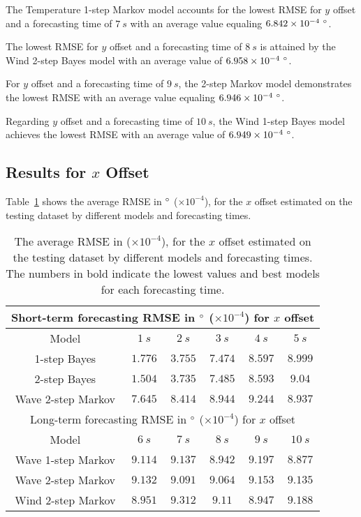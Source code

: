 \documentclass[preprint,12pt]{elsarticle}
\begin{document}
The Temperature 1-step Markov model accounts for the lowest RMSE for $y$ offset and a forecasting time of $7 \ s$ with an average value equaling $6.842 \times 10^{-4} \ \degree$.

The lowest RMSE for $y$ offset and a forecasting time of $8 \ s$ is attained by the Wind 2-step Bayes model with an average value of $6.958 \times 10^{-4} \ \degree$.

For $y$ offset and a forecasting time of $9 \ s$, the 2-step Markov model demonstrates the lowest RMSE with an average value equaling $6.946 \times 10^{-4} \ \degree$.

Regarding $y$ offset and a forecasting time of $10 \ s$, the Wind 1-step Bayes model achieves the lowest RMSE   with an average value of $6.949 \times 10^{-4} \ \degree$.

\subsection{Results for $x$ Offset}

Table~\ref{tab:best_longitude_RMSE} shows the average RMSE in $\degree$ ($\times 10^{-4}$), for the $x$ offset estimated on the testing dataset by different models and forecasting times.

\begin{table}[!ht]
	\centering
	\begin{tabular}{|c|c|c|c|c|c|}
		\hline
		\multicolumn{6}{|c|}{Short-term forecasting RMSE in $\degree$ ($\times 10^{-4}$) for $x$ offset} \\ \hline
		Model & $1 \ s$ & $2 \ s$ & $3 \ s$ & $4 \ s$ & $5 \ s$ \\ \hline
		1-step Bayes & $1.776$ & $3.755$ & $\mathbf{7.474}$ & $8.597$ & $8.999$ \\ \hline
		2-step Bayes & $\mathbf{1.504}$ & $\mathbf{3.735}$ & $7.485$ & $\mathbf{8.593}$ & $9.04$ \\ \hline
		Wave 2-step Markov & $7.645$ & $8.414$ & $8.944$ & $9.244$ & $\mathbf{8.937}$ \\ \hline
		\multicolumn{6}{|c|}{Long-term forecasting RMSE in $\degree$ ($\times 10^{-4}$) for $x$ offset} \\ \hline
		Model & $6 \ s$ & $7 \ s$ & $8 \ s$ & $9 \ s$ & $10 \ s$ \\ \hline
		Wave 1-step Markov & $9.114$ & $9.137$ & $\mathbf{8.942}$ & $9.197$ & $\mathbf{8.877}$ \\ \hline
		Wave 2-step Markov & $9.132$ & $\mathbf{9.091}$ & $9.064$ & $9.153$ & $9.135$ \\ \hline
		Wind 2-step Markov & $\mathbf{8.951}$ & $9.312$ & $9.11$ & $\mathbf{8.947}$ & $9.188$ \\ \hline
	\end{tabular}
	\caption{The average RMSE in \degree ($\times 10^{-4}$), for the $x$ offset estimated on the testing dataset by different models and forecasting times. The numbers in bold indicate the lowest values and best models for each forecasting time.}
	\label{tab:best_longitude_RMSE}
\end{table}
\end{document}

